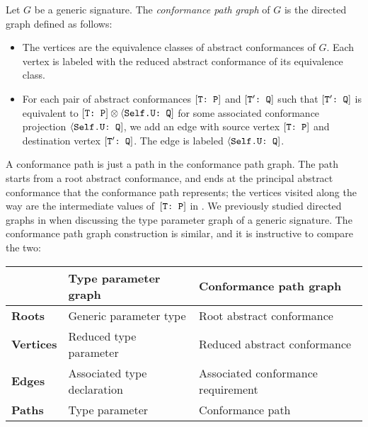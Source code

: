 \documentclass[../generics]{subfiles}
\begin{document}
\begin{definition}
Let $G$ be a generic signature. The \emph{conformance path graph} of $G$ is the directed graph defined as follows:
\begin{itemize}
\item The vertices are the equivalence classes of abstract conformances of $G$. Each vertex is labeled with the reduced abstract conformance of its equivalence class.
\item For each pair of abstract conformances $[\texttt{T:~P}]$ and $[\texttt{$\texttt{T}^\prime$:~Q}]$ such that $[\texttt{$\texttt{T}^\prime$:~Q}]$ is equivalent to $[\texttt{T:~P}] \otimes \langle\texttt{Self.U:~Q}]$ for some associated conformance projection $\langle\texttt{Self.U:~Q}]$, we add an edge with source vertex $[\texttt{T:~P}]$ and destination vertex $[\texttt{$\texttt{T}^\prime$:~Q}]$. The edge is labeled $\langle\texttt{Self.U:~Q}]$.
\end{itemize}
\end{definition}
A conformance path is just a path in the conformance path graph. The path starts from a root abstract conformance, and ends at the principal abstract conformance that the conformance path represents; the vertices visited along the way are the intermediate values of~$[\texttt{T:~P}]$ in . We previously studied directed graphs in  when discussing the type parameter graph of a generic signature. The conformance path graph construction is similar, and it is instructive to compare the two:
\begin{center}
\begin{tabular}{lll}
\toprule
&\textbf{Type parameter graph}&\textbf{Conformance path graph}\\
\midrule
\textbf{Roots}&Generic parameter type&Root abstract conformance\\
\textbf{Vertices}&Reduced type parameter&Reduced abstract conformance\\
\textbf{Edges}&Associated type declaration&Associated conformance requirement\\
\textbf{Paths}&Type parameter&Conformance path\\
\bottomrule
\end{tabular}
\end{center}
\end{document}
